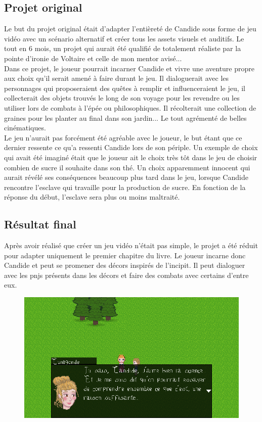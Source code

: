 \documentclass[11pt]{article}
\begin{document}
\subsection{Projet original}
Le but du projet original était d'adapter l'entièreté de Candide sous forme de jeu vidéo avec un scénario alternatif et créer tous les assets visuels et auditifs. Le tout en 6 mois, un projet qui aurait été qualifié de totalement réaliste par la pointe d'ironie de Voltaire et celle de mon mentor avisé...\\

Dans ce projet, le joueur pourrait incarner Candide et vivre une aventure propre aux choix qu'il serait amené à faire durant le jeu. Il dialoguerait avec les personnages qui proposeraient des quêtes à remplir et influenceraient le jeu, il collecterait des objets trouvés le long de son voyage pour les revendre ou les utiliser lors de combats à l'épée ou philosophiques. Il récolterait une collection de graines pour les planter au final dans son jardin... Le tout agrémenté de belles cinématiques.\\ Le jeu n'aurait pas forcément été agréable avec le joueur, le but étant que ce dernier ressente ce qu'a ressenti Candide lors de son périple. Un exemple de choix qui avait été imaginé était  que le joueur ait le choix très tôt dans le jeu de choisir combien de sucre il souhaite dans son thé. Un choix apparemment innocent qui aurait révélé ses conséquences beaucoup plus tard dans le jeu, lorsque Candide rencontre l'esclave qui travaille pour la production de sucre. En fonction de la réponse du début, l'esclave sera plus ou moins maltraité. 


\subsection{Résultat final}
Après avoir réalisé que créer un jeu vidéo n'était pas simple, le projet a été réduit pour adapter uniquement le premier chapitre du livre. 
Le joueur incarne donc Candide et peut se promener des décors inspirés de l'incipit. Il peut dialoguer avec les pnjs présents dans les décors et faire des combats avec certains d'entre eux.
\begin{figure}[H]
\includegraphics[scale=0.33]{cunegondeScn}
\centering
\end{figure}
\end{document}

